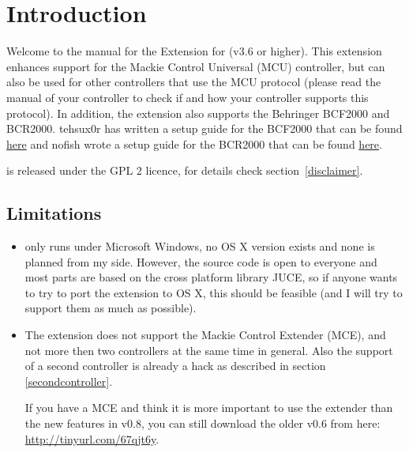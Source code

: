 
\section{Introduction}

Welcome to the manual for the \mcu Extension for \reaper (v3.6 or
higher). This extension enhances support for the Mackie Control
Universal (MCU) controller, but can also be used for other controllers
that use the MCU protocol (please read the manual of your
controller to check if and how your controller supports this
protocol). In addition, the extension also supports the Behringer
BCF2000 and BCR2000. tehsux0r has written a setup guide for the
BCF2000 that can be found
\href{http://forum.cockos.com/showthread.php?t=117909}{here}
and nofish wrote a setup guide for the BCR2000 that can be found
\href{http://forum.cockos.com/showthread.php?t=60110}{here}.

\mcu is released under the GPL 2 licence, for details check
section~\ref{disclaimer}.

\subsection{Limitations}
\begin{itemize}
\item \mcu only runs under Microsoft Windows, no OS X version exists
  and none is planned from my side. However, the source code is open to
  everyone and most parts are based on the cross platform library
  JUCE, so if anyone wants to try to port the extension to OS X, this
  should be feasible (and I will try to support them as much as
  possible).

\item The extension does not support the Mackie Control Extender
  (MCE), and  not more then two controllers at the same time in
  general. Also the support of a second controller is already a hack as
  described in section \ref{secondcontroller}.

  If you have a MCE and think it is more important to use the extender
  than the new features in v0.8, you can still download the older v0.6
  from here: \url{http://tinyurl.com/67qjt6y}.

\end{itemize}

% 

